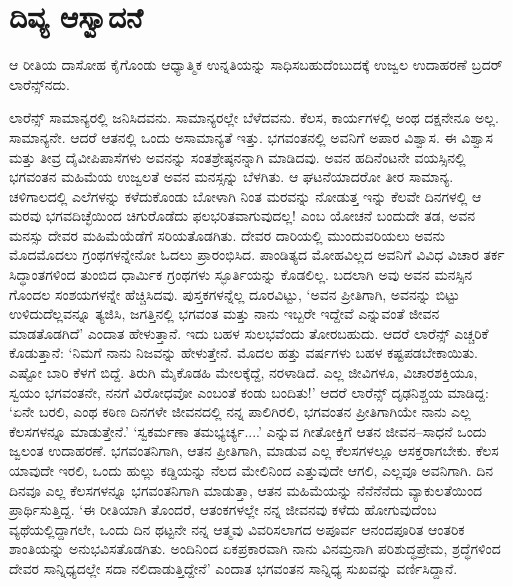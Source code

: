 \section*{ದಿವ್ಯ ಆಸ್ವಾದನೆ}


ಆ ರೀತಿಯ ದಾಸೋಹ ಕೈಗೊಂಡು ಆಧ್ಯಾತ್ಮಿಕ ಉನ್ನತಿಯನ್ನು ಸಾಧಿಸಬಹುದೆಂಬುದಕ್ಕೆ ಉಜ್ವಲ ಉದಾಹರಣೆ ಬ್ರದರ್ ಲಾರೆನ್ಸ್​ನದು.

ಲಾರೆನ್ಸ್ ಸಾಮಾನ್ಯರಲ್ಲಿ ಜನಿಸಿದವನು. ಸಾಮಾನ್ಯರಲ್ಲೇ ಬೆಳೆದವನು. ಕೆಲಸ, ಕಾರ್ಯಗಳಲ್ಲಿ ಅಂಥ ದಕ್ಷನೇನೂ ಅಲ್ಲ. ಸಾಮಾನ್ಯನೇ. ಆದರೆ ಆತನಲ್ಲಿ ಒಂದು ಅಸಾಮಾನ್ಯತೆ ಇತ್ತು. ಭಗವಂತನಲ್ಲಿ ಅವನಿಗೆ ಅಪಾರ ವಿಶ್ವಾಸ. ಈ ವಿಶ್ವಾಸ ಮತ್ತು ತೀವ್ರ ದೈವೀಪಿಪಾಸೆಗಳು ಅವನನ್ನು ಸಂತಶ್ರೇಷ್ಠನನ್ನಾಗಿ ಮಾಡಿದವು. ಅವನ ಹದಿನೆಂಟನೇ ವಯಸ್ಸಿನಲ್ಲಿ ಭಗವಂತನ ಮಹಿಮೆಯ ಉಜ್ವಲತೆ ಅವನ ಮನಸ್ಸನ್ನು ಬೆಳಗಿತು. ಆ ಘಟನೆಯಾದರೋ ತೀರ ಸಾಮಾನ್ಯ. ಚಳಿಗಾಲದಲ್ಲಿ ಎಲೆಗಳನ್ನು ಕಳೆದುಕೊಂಡು ಬೋಳಾಗಿ ನಿಂತ ಮರವನ್ನು ನೋಡುತ್ತ ಇನ್ನು ಕೆಲವೇ ದಿನಗಳಲ್ಲಿ ಆ ಮರವು ಭಗವದಿಚ್ಛೆಯಿಂದ ಚಿಗುರೊಡೆದು ಫಲಭರಿತವಾಗುವುದಲ್ಲ! ಎಂಬ ಯೋಚನೆ ಬಂದುದೇ ತಡ, ಅವನ ಮನಸ್ಸು ದೇವರ ಮಹಿಮೆಯೆಡೆಗೆ ಸರಿಯತೊಡಗಿತು. ದೇವರ ದಾರಿಯಲ್ಲಿ ಮುಂದುವರಿಯಲು ಅವನು ಮೊದಮೊದಲು ಗ್ರಂಥಗಳನ್ನೇನೋ ಓದಲು ಪ್ರಾರಂಭಿಸಿದ. ಪಾಂಡಿತ್ಯದ ಮೋಹವಿಲ್ಲದ ಅವನಿಗೆ ವಿವಿಧ ವಿಚಾರ ತರ್ಕ ಸಿದ್ಧಾಂತಗಳಿಂದ ತುಂಬಿದ ಧಾರ್ಮಿಕ ಗ್ರಂಥಗಳು ಸ್ಫೂರ್ತಿಯನ್ನು ಕೊಡಲಿಲ್ಲ. ಬದಲಾಗಿ ಅವು ಅವನ ಮನಸ್ಸಿನ ಗೊಂದಲ ಸಂಶಯಗಳನ್ನೇ ಹೆಚ್ಚಿಸಿದವು. ಪುಸ್ತಕಗಳನ್ನೆಲ್ಲ ದೂರವಿಟ್ಟು, ‘ಅವನ ಪ್ರೀತಿಗಾಗಿ, ಅವನನ್ನು ಬಿಟ್ಟು ಉಳಿದುದೆಲ್ಲವನ್ನೂ ತ್ಯಜಿಸಿ, ಜಗತ್ತಿನಲ್ಲಿ ಭಗವಂತ ಮತ್ತು ನಾನು ಇಬ್ಬರೇ ಇದ್ದೇವೆ ಎನ್ನುವಂತೆ ಜೀವನ ಮಾಡತೊಡಗಿದೆ’ ಎಂದಾತ ಹೇಳುತ್ತಾನೆ. ಇದು ಬಹಳ ಸುಲಭವೆಂದು ತೋರಬಹುದು. ಆದರೆ ಲಾರೆನ್ಸ್ ಎಚ್ಚರಿಕೆ ಕೊಡುತ್ತಾನೆ: ‘ನಿಮಗೆ ನಾನು ನಿಜವನ್ನು ಹೇಳುತ್ತೇನೆ. ಮೊದಲ ಹತ್ತು ವರ್ಷಗಳು ಬಹಳ ಕಷ್ಟಪಡಬೇಕಾಯಿತು. ಎಷ್ಟೋ ಬಾರಿ ಕೆಳಗೆ ಬಿದ್ದೆ. ತಿರುಗಿ ಮೈಕೊಡಹಿ ಮೇಲಕ್ಕೆದ್ದೆ, ನರಳಾಡಿದೆ. ಎಲ್ಲ ಜೀವಿಗಳೂ, ವಿಚಾರಶಕ್ತಿಯೂ, ಸ್ವಯಂ ಭಗವಂತನೇ, ನನಗೆ ವಿರೋಧವೋ ಎಂಬಂತೆ ಕಂಡು ಬಂದಿತು!’ ಆದರೆ ಲಾರೆನ್ಸ್ ದೃಢನಿಶ್ಚಯ ಮಾಡಿದ್ದ: ‘ಏನೇ ಬರಲಿ, ಎಂಥ ಕಠಿಣ ದಿನಗಳೇ ಜೀವನದಲ್ಲಿ ನನ್ನ ಪಾಲಿಗಿರಲಿ, ಭಗವಂತನ ಪ್ರೀತಿಗಾಗಿಯೇ ನಾನು ಎಲ್ಲ ಕೆಲಸಗಳನ್ನೂ ಮಾಡುತ್ತೇನೆ.’ ‘ಸ್ವಕರ್ಮಣಾ ತಮಭ್ಯರ್ಚ್ಯ....’ ಎನ್ನುವ ಗೀತೋಕ್ತಿಗೆ ಆತನ ಜೀವನ–ಸಾಧನೆ ಒಂದು ಜ್ವಲಂತ ಉದಾಹರಣೆ. ಭಗವಂತನಿಗಾಗಿ, ಆತನ ಪ್ರೀತಿಗಾಗಿ, ಮಾಡುವ ಎಲ್ಲ ಕೆಲಸಗಳಲ್ಲೂ ಆಸಕ್ತರಾಗಬೇಕು. ಕೆಲಸ ಯಾವುದೇ ಇರಲಿ, ಒಂದು ಹುಲ್ಲು ಕಡ್ಡಿಯನ್ನು ನೆಲದ ಮೇಲಿನಿಂದ ಎತ್ತುವುದೇ ಆಗಲಿ, ಎಲ್ಲವೂ ಅವನಿಗಾಗಿ. ದಿನ ದಿನವೂ ಎಲ್ಲ ಕೆಲಸಗಳನ್ನೂ ಭಗವಂತನಿಗಾಗಿ ಮಾಡುತ್ತಾ, ಆತನ ಮಹಿಮೆಯನ್ನು ನೆನೆನೆನೆದು ವ್ಯಾಕುಲತೆಯಿಂದ ಪ್ರಾರ್ಥಿಸುತ್ತಿದ್ದ. ‘ಈ ರೀತಿಯಾಗಿ ತೊಂದರೆ, ಆತಂಕಗಳಲ್ಲೇ ನನ್ನ ಜೀವನವು ಕಳೆದು ಹೋಗುವುದೆಂಬ ವ್ಯಥೆಯಲ್ಲಿದ್ದಾಗಲೇ, ಒಂದು ದಿನ ಥಟ್ಟನೇ ನನ್ನ ಆತ್ಮವು ವಿವರಿಸಲಾಗದ ಅಪೂರ್ವ ಆನಂದಪೂರಿತ ಆಂತರಿಕ ಶಾಂತಿಯನ್ನು ಅನುಭವಿಸತೊಡಗಿತು. ಅಂದಿನಿಂದ ಏಕಪ್ರಕಾರವಾಗಿ ನಾನು ವಿನಮ್ರನಾಗಿ ಪರಿಶುದ್ಧಪ್ರೇಮ, ಶ್ರದ್ಧೆಗಳಿಂದ ದೇವರ ಸಾನ್ನಿಧ್ಯದಲ್ಲೇ ಸದಾ ನಲಿದಾಡುತ್ತಿದ್ದೇನೆ’ ಎಂದಾತ ಭಗವಂತನ ಸಾನ್ನಿಧ್ಯ ಸುಖವನ್ನು ವರ್ಣಿಸಿದ್ದಾನೆ.

